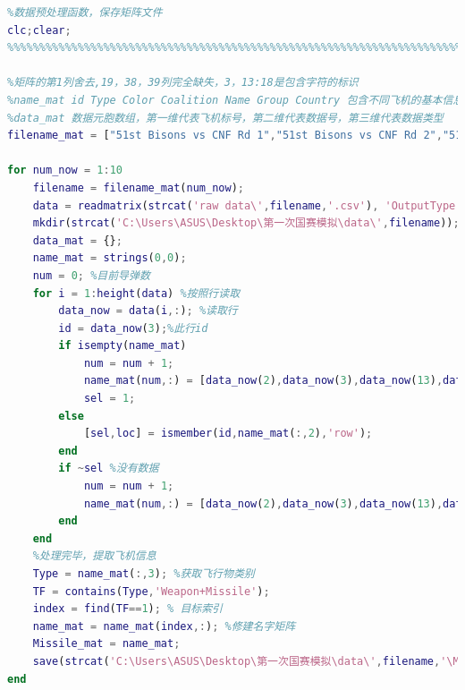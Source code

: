\documentclass{my_paper}
\begin{document}
\begin{lstlisting}[language=matlab]
    %%%%%%%%%%%%%%%%%%%%%%%%%%%%%%%%%%%%%%%%%%%%%%%%%%%%%%%%%%%%%%%%%%%%%%%%%%%
%数据预处理函数，保存矩阵文件
clc;clear;
%%%%%%%%%%%%%%%%%%%%%%%%%%%%%%%%%%%%%%%%%%%%%%%%%%%%%%%%%%%%%%%%%%%%%%%%%%%

%矩阵的第1列舍去,19，38，39列完全缺失，3，13:18是包含字符的标识
%name_mat id Type Color Coalition Name Group Country 包含不同飞机的基本信息矩阵
%data_mat 数据元胞数组，第一维代表飞机标号，第二维代表数据号，第三维代表数据类型
filename_mat = ["51st Bisons vs CNF Rd 1","51st Bisons vs CNF Rd 2","51st vs 36th R1","51st vs 36th R2","51st vs uvaf round 1","51st vs uvaf round 2","51st vs uvaf round 3","51stKIAP_vs_36th_Round_1","51stKIAP_vs_36th_Round_2","51stKIAP_vs_107th_Round_1"];

for num_now = 1:10
    filename = filename_mat(num_now);
    data = readmatrix(strcat('raw data\',filename,'.csv'), 'OutputType', 'string'); %以字符串格式读入数据
    mkdir(strcat('C:\Users\ASUS\Desktop\第一次国赛模拟\data\',filename));
    data_mat = {};
    name_mat = strings(0,0);
    num = 0; %目前导弹数
    for i = 1:height(data) %按照行读取
        data_now = data(i,:); %读取行  
        id = data_now(3);%此行id
        if isempty(name_mat)
            num = num + 1;
            name_mat(num,:) = [data_now(2),data_now(3),data_now(13),data_now(15),data_now(4:6)]; %录入新导弹信
            sel = 1;
        else
            [sel,loc] = ismember(id,name_mat(:,2),'row');
        end
        if ~sel %没有数据
            num = num + 1;
            name_mat(num,:) = [data_now(2),data_now(3),data_now(13),data_now(15),data_now(4:6)]; %录入新导弹信息
        end
    end
    %处理完毕，提取飞机信息
    Type = name_mat(:,3); %获取飞行物类别
    TF = contains(Type,'Weapon+Missile');
    index = find(TF==1); % 目标索引
    name_mat = name_mat(index,:); %修建名字矩阵
    Missile_mat = name_mat;
    save(strcat('C:\Users\ASUS\Desktop\第一次国赛模拟\data\',filename,'\Missile_data.mat'),"Missile_mat"); %保存名字矩阵
end

\end{lstlisting}
\end{document}
